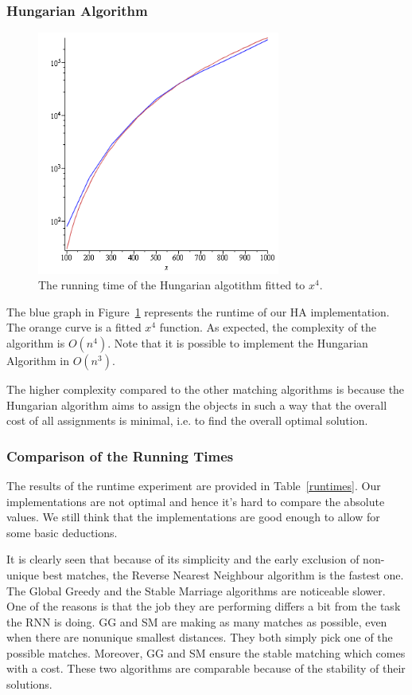 \documentclass[a4paper,11pt]{article}
\begin{document}
\subsubsection{Hungarian Algorithm}

\begin{figure}[ht!]
\centering 
\includegraphics[width=80mm]{HA_runtime.png}
\caption{The running time of the Hungarian algotithm fitted to $x^4$.}
\label{hung} 
\end{figure}

The blue graph in Figure~\ref{hung} represents the runtime of our HA implementation. The orange curve is a fitted $x^4$ function. As expected, the complexity of the algorithm is $O(n^{4})$. Note that it is possible to implement the Hungarian Algorithm in $O(n^{3})$.

The higher complexity compared to the other matching algorithms is because the Hungarian algorithm aims to assign the objects in such a way that the overall cost of all assignments is minimal, i.e. to find the overall optimal solution.

\subsubsection{Comparison of the Running Times}
The results of the runtime experiment are provided in Table~\ref{runtimes}. Our implementations are not optimal and hence it's hard to compare the absolute values. We still think that the implementations are good enough to allow for some basic deductions.

It is clearly seen that because of its simplicity and the early exclusion of non-unique best matches, the Reverse Nearest Neighbour algorithm is the fastest one. The Global Greedy and the Stable Marriage algorithms are noticeable slower. One of the reasons is that the job they are performing differs a bit from the task the RNN is doing. GG and SM are making as many matches as possible, even when there are nonunique smallest distances. They both simply pick one of the possible matches. Moreover, GG and SM ensure the stable matching which comes with a cost. These two algorithms are comparable because of the stability of their solutions.
\end{document}
